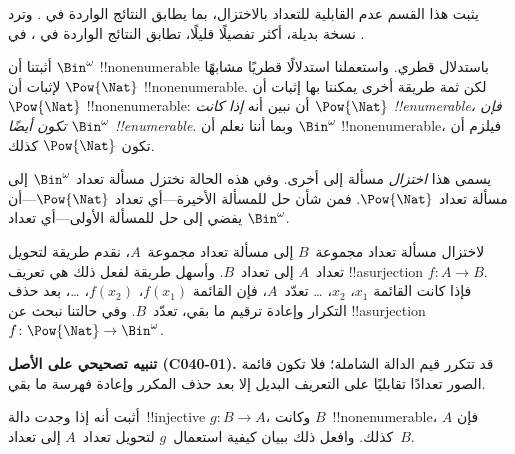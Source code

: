 \documentclass[../../../include/open-logic-section]{subfiles}
\begin{document}


\begin{editorial}
  يثبت هذا القسم عدم القابلية للتعداد بالاختزال، بما يطابق النتائج
  الواردة في . وترد نسخة بديلة، أكثر تفصيلًا
  قليلًا، تطابق النتائج الواردة في ، في
  .
\end{editorial}

أثبتنا أن $\Bin^\omega$ !!{nonenumerable} باستدلال قطري.
واستعملنا استدلالًا قطريًا مشابهًا لإثبات أن
$\Pow{\Nat}$ !!{nonenumerable}. لكن ثمة طريقة أخرى يمكننا بها إثبات
أن $\Pow{\Nat}$ !!{nonenumerable}: أن نبين أنه \emph{إذا كانت
$\Pow{\Nat}$ !!{enumerable}، فإن $\Bin^\omega$ تكون أيضًا
!!{enumerable}}. وبما أننا نعلم أن $\Bin^\omega$ !!{nonenumerable}،
فيلزم أن تكون $\Pow{\Nat}$ كذلك.

يسمى هذا \emph{اختزال} مسألة إلى أخرى. وفي هذه الحالة نختزل مسألة
تعداد $\Bin^\omega$ إلى مسألة تعداد $\Pow{\Nat}$. فمن شأن حل للمسألة
الأخيرة---أي تعداد $\Pow{\Nat}$---أن يفضي إلى حل للمسألة
الأولى---أي تعداد $\Bin^\omega$.

لاختزال مسألة تعداد مجموعة~$B$ إلى مسألة تعداد مجموعة~$A$، نقدم
طريقة لتحويل تعداد~$A$ إلى تعداد~$B$. وأسهل طريقة لفعل ذلك هي تعريف
!!a{surjection} $f\colon A \to B$. فإذا كانت القائمة $x_1$، $x_2$،
\dots{} تعدّد~$A$، فإن القائمة $f(x_1)$، $f(x_2)$، \dots{}، بعد حذف
التكرار وإعادة ترقيم ما بقي، تعدّد~$B$.
وفي حالتنا نبحث عن !!a{surjection} $f\colon \Pow{\Nat}
\to \Bin^\omega$.

\textbf{تنبيه تصحيحي على الأصل (C040-01).} قد تتكرر قيم الدالة الشاملة؛ فلا
تكون قائمة الصور تعدادًا تقابليًا على التعريف البديل إلا بعد حذف المكرر
وإعادة فهرسة ما بقي.

\begin{prob}
أثبت أنه إذا وجدت دالة~!!{injective} $g\colon B \to A$، وكانت
$B$~!!{nonenumerable}، فإن $A$ كذلك. وافعل ذلك ببيان كيفية استعمال~$g$
لتحويل تعداد~$A$ إلى تعداد~$B$.
\end{prob}
\end{document}
